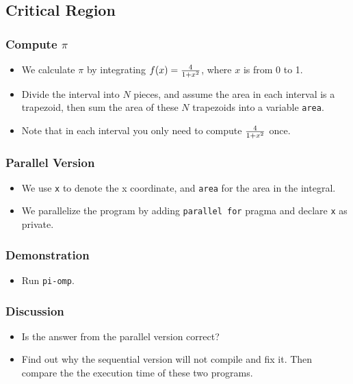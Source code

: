 \documentclass{beamer}
\begin{document}
\subsection{Critical Region}

\begin{frame}
  \frametitle{Compute $\pi$} 
  \begin{itemize}
  \item We calculate $\pi$ by integrating $f(x) = {4 \over {1 +
      x^2}}$, where $x$ is from 0 to 1.
  \item Divide the interval into $N$ pieces, and assume the area in each
    interval is a trapezoid, then sum the area of these $N$ trapezoids
    into a variable {\tt area}.  
  \item Note that in each interval you only need to compute $4 \over {1
    + x^2}$ once.
  \end{itemize}
\end{frame}

\begin{frame}
  \frametitle{Parallel Version} 
  \begin{itemize}
    \item We use {\tt x} to denote the x coordinate, and {\tt area}
      for the area in the integral.
    \item We parallelize the program by adding {\tt parallel for} pragma
      and declare {\tt x} as private.
  \end{itemize}
\end{frame}

\begin{frame}
\end{frame}

\begin{frame}
  \frametitle{Demonstration}
  \begin{itemize}
  \item Run {\tt pi-omp}.
  \end{itemize}
\end{frame}

\begin{frame}
  \frametitle{Discussion}
  \begin{itemize}
  \item Is the answer from the parallel version correct? 
  \item Find out why the sequential version will not compile and fix
    it.  Then compare the the execution time of these two programs.
  \end{itemize}
\end{frame}
\end{document}
